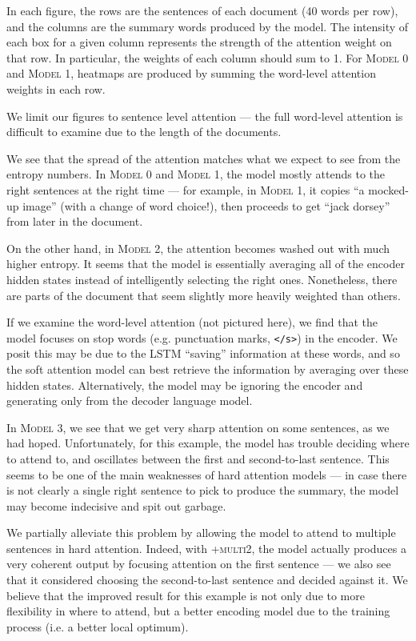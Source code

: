 \documentclass[12pt]{report}
\begin{document}
In each figure, the rows are the sentences of each document (40 words per row), and the columns are the summary words produced by the model. The intensity of each box for a given column represents the strength of the attention weight on that row. In particular, the weights of each column should sum to 1.
For \textsc{Model 0} and \textsc{Model 1}, heatmaps are produced by summing the word-level attention weights in each row.

We limit our figures to sentence level attention --- the full word-level attention is difficult to examine due to the length of the documents.

We see that the spread of the attention matches what we expect to see from the entropy numbers. In \textsc{Model 0} and \textsc{Model 1}, the model mostly attends to the right sentences at the right time --- for example, in \textsc{Model 1}, it copies ``a mocked-up image'' (with a change of word choice!), then proceeds to get ``jack dorsey'' from later in the document.

On the other hand, in \textsc{Model 2}, the attention becomes washed out with much higher entropy. It seems that the model is essentially averaging all of the encoder hidden states instead of intelligently selecting the right ones. Nonetheless, there are parts of the document that seem slightly more heavily weighted than others.

If we examine the word-level attention (not pictured here), we find that the model focuses on stop words (e.g. punctuation marks, \texttt{</s>}) in the encoder. We posit this may be due to the LSTM ``saving'' information at these words, and so the soft attention model can best retrieve the information by averaging over these hidden states. Alternatively, the model may be ignoring the encoder and generating only from the decoder language model.

In \textsc{Model 3}, we see that we get very sharp attention on some sentences, as we had hoped. Unfortunately, for this example, the model has trouble deciding where to attend to, and oscillates between the first and second-to-last sentence. This seems to be one of the main weaknesses of hard attention models --- in case there is not clearly a single right sentence to pick to produce the summary, the model may become indecisive and spit out garbage.

We partially alleviate this problem by allowing the model to attend to multiple sentences in hard attention. Indeed, with \textsc{+multi2}, the model actually produces a very coherent output by focusing attention on the first sentence --- we also see that it considered choosing the second-to-last sentence and decided against it.
We believe that the improved result for this example is not only due to more flexibility in where to attend, but a better encoding model due to the training process (i.e. a better local optimum).
\end{document}

